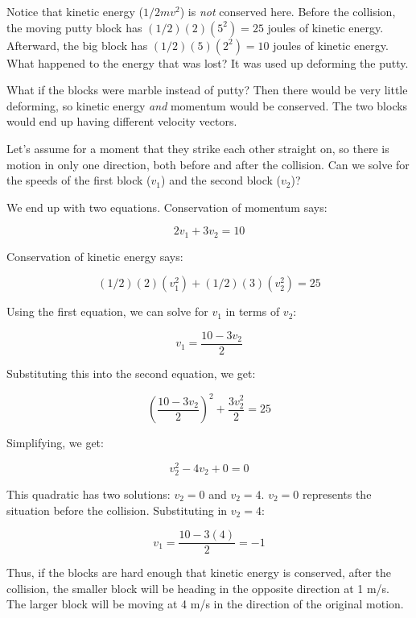 Notice that kinetic energy ($1/2 m v^2$) is \emph{not} conserved
here.  Before the collision, the moving putty block has $(1/2)(2)(5^2) = 25$
joules of kinetic energy.  Afterward, the big block has $(1/2)(5)(2^2)
= 10$ joules of kinetic energy.  What happened to the energy that was
lost? It was used up deforming the putty.

What if the blocks were marble instead of putty?  Then there would be
very little deforming, so kinetic energy \emph{and} momentum would be
conserved. The two blocks would end up having different velocity
vectors.

Let's assume for a moment that they strike each other straight on, so
there is motion in only one direction, both before and after the
collision.  Can we solve for the speeds of the first block ($v_1$) and
the second block ($v_2$)?

We end up with two equations. Conservation of momentum says:

$$2 v_1 + 3 v_2 = 10$$

Conservation of kinetic energy says:

$$(1/2)(2)(v_1^2) + (1/2)(3)(v_2^2) = 25$$

Using the first equation, we can solve for $v_1$ in terms of $v_2$:

$$v_1 = \frac{10 - 3 v_2}{2}$$

Substituting this into the second equation, we get:

$$\left(\frac{10 - 3 v_2}{2}\right)^2 + \frac{3 v_2^2}{2} = 25$$

Simplifying, we get:

$$v_2^2 - 4 v_2 + 0 = 0$$

This quadratic has two solutions: $v_2 = 0$ and $v_2 = 4$.  $v_2 = 0$
represents the situation before the collision.  Substituting in $v_2 = 4$:

$$v_1 = \frac{10 - 3(4)}{2} = -1$$

Thus, if the blocks are hard enough that kinetic energy is conserved,
after the collision, the smaller block will be heading in the opposite
direction at 1 m/s.  The larger block will be moving at 4 m/s in the
direction of the original motion.

